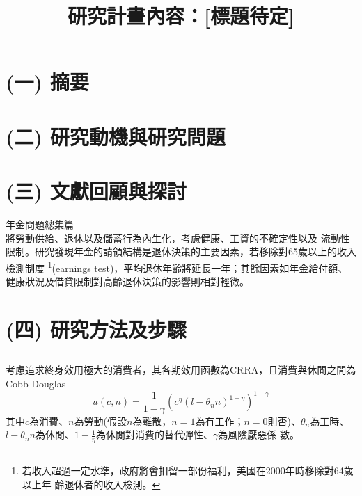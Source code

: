 \documentclass[12pt]{article}
\title{研究計畫內容：[標題待定]}
\date{}
\begin{document}
\begin{CJK*}{UTF8}{bkai}

\maketitle

\section*{\normalfont(一) 摘要}

\section*{\normalfont(二) 研究動機與研究問題}

\section*{\normalfont(三) 文獻回顧與探討}

\cite{barr2006}年金問題總集篇\\

\cite{french2005}將勞動供給、退休以及儲蓄行為內生化，考慮健康、工資的不確定性以及
流動性限制。研究發現年金的請領結構是退休決策的主要因素，若移除對65歲以上的收入檢測制度
\footnote{若收入超過一定水準，政府將會扣留一部份福利，美國在2000年時移除對64歲以上年
齡退休者的收入檢測。}(earnings test)，平均退休年齡將延長一年；其餘因素如年金給付額、
健康狀況及借貸限制對高齡退休決策的影響則相對輕微。\\

\cite{jhang2020}

\section*{\normalfont(四) 研究方法及步驟}
\subsection*{}

\subsection*{}
考慮追求終身效用極大的消費者，其各期效用函數為CRRA，且消費與休閒之間為Cobb-Douglas
\begin{equation}
    u(c,n) = \frac{1}{1-\gamma}(c^\eta (l-\theta_n n)^{1-\eta})^{1-\gamma}
\end{equation}
其中$c$為消費、$n$為勞動(假設$n$為離散，$n=1$為有工作；$n=0$則否)、$\theta_n$為工時、
$l-\theta_n n$為休閒、$1-\frac{1}{\eta}$為休閒對消費的替代彈性、$\gamma$為風險厭惡係
數。


\end{CJK*}
\end{document}
